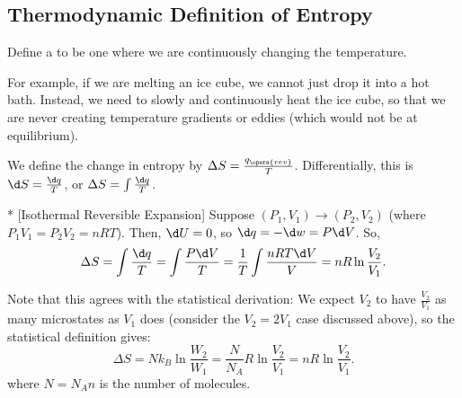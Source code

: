 \subsection{Thermodynamic Definition of Entropy}

\begin{defn}
	Define a  to be one where we are continuously changing the temperature.
\end{defn}

For example, if we are melting an ice cube, we cannot just drop it into a hot bath.
Instead, we need to slowly and continuously heat the ice cube, so that we are never creating temperature gradients or eddies (which would not be at equilibrium).

\begin{defn}
	We define the change in entropy by $\Delta S = \frac{q_{\opera{rev}}}{T}$.
	Differentially, this is $\d S = \frac{\d q}{T}$, or $\Delta S = \int \frac{\d q}{T}$.
\end{defn}

\begin{exm}*
	[Isothermal Reversible Expansion]
	Suppose $(P_1, V_1) \to (P_2, V_2)$ (where $P_1V_1 = P_2V_2 = nRT$).
	Then, $\d U = 0$, so $\d q = - \d w = P\d V$. So, \[
		\Delta S = \int \frac{\d q}{T} = \int \frac{P\d V}{T} = \frac 1T \int \frac{nRT \d V}{V} = nR \ln \frac{V_2}{V_1}.
	\]
\end{exm}

Note that this agrees with the statistical derivation:
We expect $V_2$ to have $\frac{V_2}{V_1}$ as many microstates as $V_1$ does (consider the $V_2 = 2V_1$ case discussed above), so the statistical definition gives: \[
	\Delta S = N k_B \ln \frac{W_2}{W_1} = \frac{N}{N_A} R \ln \frac{V_2}{V_1} = nR \ln \frac{V_2}{V_1}.
\]
where $N = N_An$ is the number of molecules.


